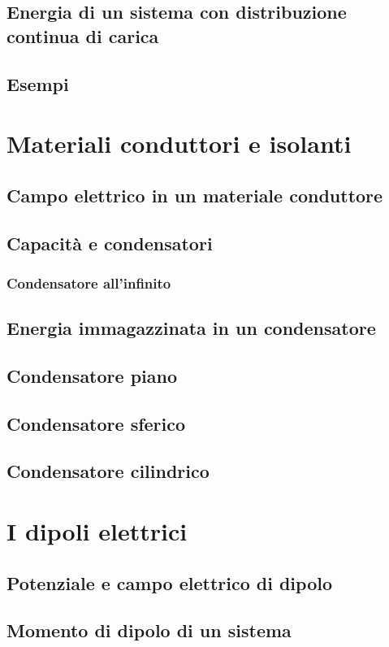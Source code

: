 \documentclass{book}
\begin{document}
\section{Energia di un sistema con distribuzione continua di carica}
\section{Esempi}

\chapter{Materiali conduttori e isolanti}
\section{Campo elettrico in un materiale conduttore}
\section{Capacit\`a e condensatori}
\subsection{Condensatore all'infinito}
\section{Energia immagazzinata in un condensatore}
\section{Condensatore piano}
\section{Condensatore sferico}
\section{Condensatore cilindrico}

\chapter{I dipoli elettrici}
\section{Potenziale e campo elettrico di dipolo}
\section{Momento di dipolo di un sistema}
\end{document}
